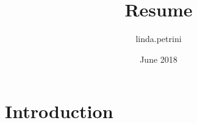 \documentclass{article}
\title{Resume}
\author{linda.petrini }
\date{June 2018}
\begin{document}
\maketitle

\section{Introduction}
\end{document}

